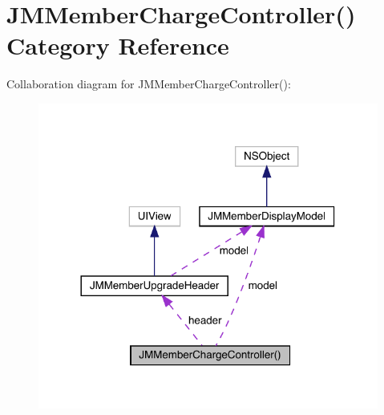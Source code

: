 \hypertarget{category_j_m_member_charge_controller_07_08}{}\section{J\+M\+Member\+Charge\+Controller() Category Reference}
\label{category_j_m_member_charge_controller_07_08}


Collaboration diagram for J\+M\+Member\+Charge\+Controller()\+:\nopagebreak
\begin{figure}[H]
\begin{center}
\leavevmode
\includegraphics[width=317pt]{category_j_m_member_charge_controller_07_08__coll__graph}
\end{center}
\end{figure}
